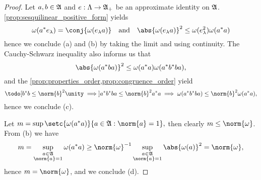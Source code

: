 \begin{proof}
Let \(a, b \in \mathfrak{A}\)  and \(e : \Lambda \to \mathfrak{A}_+\) be an approximate identity on \(\mathfrak{A}\). \cref{prop:sesquilinear_positive_form} yields
    \begin{equation*}
        \omega(a^* e_\lambda) = \conj{\omega(e_\lambda a)}
        \quad\text{and}\quad
        \abs{\omega(e_\lambda a)}^2 \leq \omega(e_\lambda^2) \omega(a^*a)
    \end{equation*}
    hence we conclude (a) and (b) by taking the limit and using continuity. The Cauchy-Schwarz inequality also informs us that
    \begin{equation*}
        \abs{\omega(a^*ba)}^2 \leq \omega(a^*a) \omega(a^*b^*ba),
    \end{equation*}
    and the \cref{prop:properties_order,prop:congruence_order} yield
    \begin{equation*}
        \todo[b^*b \leq \norm{b}^2 \unity \implies] a^* b^*b a \leq \norm{b}^2 a^*a \implies \omega(a^*b^*ba) \leq \norm{b}^2 \omega(a^*a),
    \end{equation*}
    hence we conclude (c). 

    Let \(m = \sup\setc{\omega(a^*a)}{a \in \algebra{A} : \norm{a} = 1},\) then clearly \(m \leq \norm{\omega}\). From (b) we have
    \begin{equation*}
        m = \sup_{\substack{a \in \algebra{A}\\\norm{a} = 1}}{\omega(a^*a)} \geq \norm{\omega}^{-1} \sup_{\substack{a \in \algebra{A}\\\norm{a} = 1}} \abs{\omega(a)}^2 = \norm{\omega},
    \end{equation*}
    hence \(m = \norm{\omega}\), and we conclude (d).
\end{proof}

